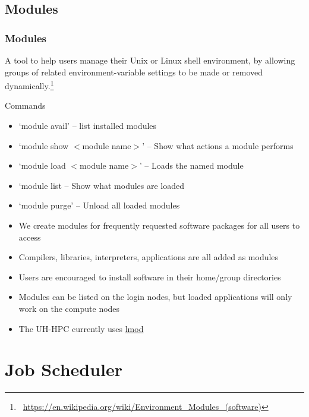 \subsection{Modules}
\begin{frame}
	\frametitle{Modules}\footnotesize

	  A tool to help users manage their Unix or Linux shell environment, by allowing groups of related environment-variable settings to be made or removed dynamically.\footnote{\label{wiki_module}\tiny\
             \url{https://en.wikipedia.org/wiki/Environment_Modules_(software)}}
	\begin{block}{Commands}
	  \begin{itemize}\footnotesize
			\item `module avail' -- list installed modules
			\item `module show $<$module name$>$' -- Show what actions a module performs
			\item `module load $<$module name$>$' -- Loads the named module
                        \item `module list -- Show what modules are loaded
			\item `module purge' -- Unload all loaded modules
		\end{itemize}
        \end{block}
	\begin{itemize}\footnotesize
		\item We create modules for frequently requested software packages for all users to access
		\item Compilers, libraries, interpreters, applications are all added as modules
		\item Users are encouraged to install software in their home/group directories
		\item Modules can be listed on the login nodes, but loaded applications will only work on the compute nodes
                \item The UH-HPC currently uses \href{https://lmod.readthedocs.io/en/latest/010\_user.html}{lmod}
	\end{itemize}
\end{frame}

\section[Job Scheduler]{Job Scheduler}
